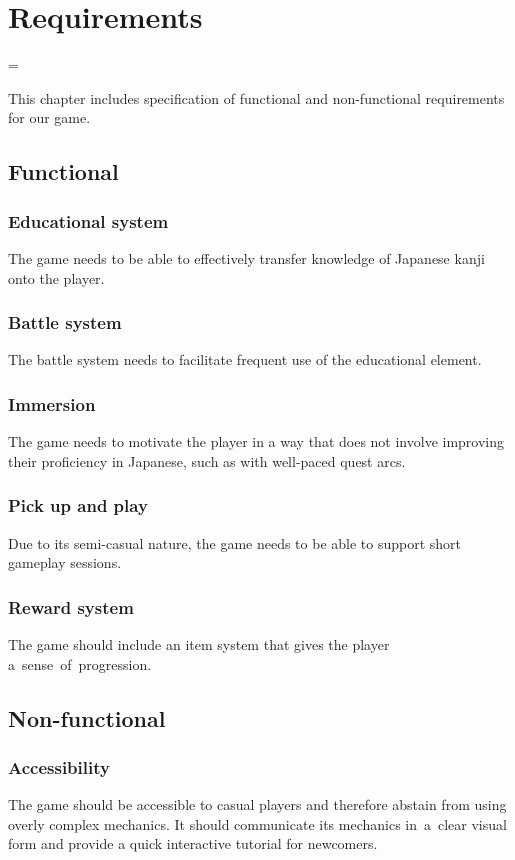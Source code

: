 \documentclass[thesis=B,english,hidelinks]{FITthesisXE}[2012/06/26]
\begin{document}
\chapter{Requirements}

\emergencystretch=\maxdimen
{}

This chapter includes specification of functional and non-functional requirements for our game.

\section{Functional}

\subsection{Educational system}
The game needs to be able to effectively transfer knowledge of Japanese kanji onto the player.

\subsection{Battle system}
The battle system needs to facilitate frequent use of the educational element.

\subsection{Immersion}
The game needs to motivate the player in a way that does not involve improving their proficiency in Japanese, such as with well-paced quest arcs.

\subsection{Pick up and play}
Due to its semi-casual nature, the game needs to be able to support short gameplay sessions.

\subsection{Reward system}
The game should include an item system that gives the player a~sense~of~progression.

\section{Non-functional}

\subsection{Accessibility}
The game should be accessible to casual players and therefore abstain from using overly complex mechanics. It should communicate its mechanics in~a~clear visual form and provide a quick interactive tutorial for newcomers.
\end{document}
